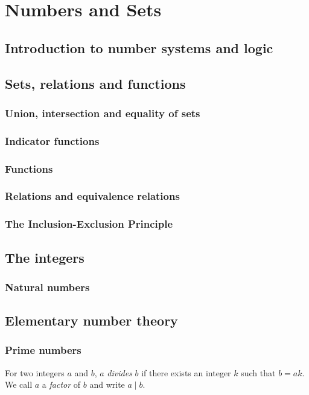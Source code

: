 \documentclass[main.tex]{subfiles}
\begin{document}
	\chapter{Numbers and Sets}
	
	\section{Introduction to number systems and logic}
	
	\section{Sets, relations and functions}
		\subsection{Union, intersection and equality of sets}
		
		\subsection{Indicator functions}
		
		\subsection{Functions}
		
		\subsection{Relations and equivalence relations}
		
		\subsection{The Inclusion-Exclusion Principle}
		
	\section{The integers}
		\subsection{Natural numbers}
		
	\section{Elementary number theory}
		\subsection{Prime numbers}
			\begin{definition}
			 For two integers $a$ and $b$, $a$ \textit{divides} $b$ if there exists an integer $k$ such that $b = ak$. We call $a$ a \textit{factor} of $b$ and write $a \mid b$.
			\end{definition}
			
\end{document}
